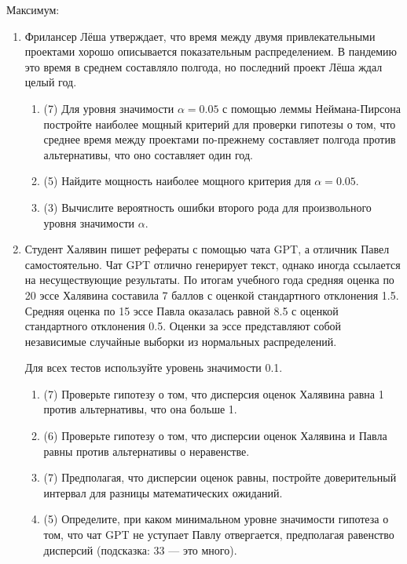 Максимум:

\begin{enumerate}
\item Фрилансер Лёша утверждает, что время между двумя привлекательными проектами хорошо описывается показательным распределением. 
В пандемию это время в среднем составляло полгода, но последний проект Лёша ждал целый год. 

\begin{enumerate}
\item (7) Для уровня значимости $\alpha=0.05$ с помощью леммы Неймана-Пирсона постройте наиболее мощный критерий для проверки гипотезы о том, что среднее время между проектами по-прежнему составляет полгода против альтернативы, что оно составляет один год.
\item (5) Найдите мощность наиболее мощного критерия для $\alpha=0.05$.
\item (3) Вычислите вероятность ошибки второго рода для произвольного уровня значимости $\alpha$.
\end{enumerate}

\item 
Студент Халявин пишет рефераты с помощью чата GPT, а отличник Павел самостоятельно. 
Чат GPT отлично генерирует текст, однако иногда ссылается на несуществующие результаты. 
По итогам учебного года средняя оценка по 20 эссе Халявина составила 7 баллов с оценкой стандартного отклонения 1.5.
Средняя оценка по 15 эссе Павла оказалась равной 8.5 с оценкой стандартного отклонения 0.5. 
Оценки за эссе представляют собой независимые случайные выборки из нормальных распределений.

Для всех тестов используйте уровень значимости 0.1.

\begin{enumerate}
\item (7) Проверьте гипотезу о том, что дисперсия оценок Халявина равна 1 против альтернативы, что она больше 1.
\item (6) Проверьте гипотезу о том, что дисперсии оценок Халявина и Павла равны против альтернативы о неравенстве.
\item (7) Предполагая, что дисперсии оценок равны, постройте доверительный интервал для разницы математических ожиданий.
\item (5) Определите, при каком минимальном уровне значимости гипотеза о том, что чат GPT не уступает Павлу отвергается, предполагая равенство дисперсий (подсказка: 33 — это много).
\end{enumerate}



\end{enumerate}
